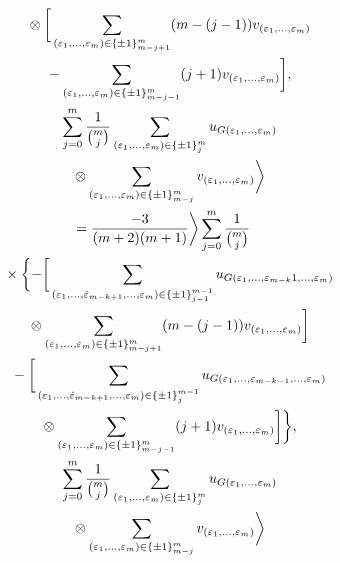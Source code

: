 \documentclass[pdftex]{sigma}
\numberwithin{equation}{section}
\begin{document}
\begin{enumerate}
\begin{itemize}
\begin{gather*}
\hphantom{\eta_{13}^\phi(e_{4k-j_1},e_{4k-j_2}) =}{}
 \otimes\bigg[ \sum_{(\varepsilon_{1},\dots, \varepsilon_{m})\in\{\pm
1\}_{m-j+1}^{m}}(m-(j-1))v_{(\varepsilon_{1},\dots,\varepsilon_m)}\\
\hphantom{\eta_{13}^\phi(e_{4k-j_1},e_{4k-j_2}) =}{}
-\sum_{(\varepsilon_{1},\dots, \varepsilon_{m})\in\{\pm
1\}_{m-j-1}^{m}}(j+1)v_{(\varepsilon_{1},\dots,\varepsilon_m)}\bigg] ,\\
\hphantom{\eta_{13}^\phi(e_{4k-j_1},e_{4k-j_2}) =}{}
\sum_{j=0}^{m}\frac{1}{{m\choose j}}\sum_{(\varepsilon_{1},\dots, \varepsilon_{m})\in\{\pm
1\}_{j}^{m}}u_{G(\varepsilon_1,\dots,\varepsilon_m)}\\
\hphantom{\eta_{13}^\phi(e_{4k-j_1},e_{4k-j_2}) =}{}
\otimes
\sum_{(\varepsilon_{1},\dots, \varepsilon_{m})\in\{\pm 1\}_{m-j}^{m}}v_{(\varepsilon_1,\dots,\varepsilon_m)}\bigg\rangle\\
\hphantom{\eta_{13}^\phi(e_{4k-j_1},e_{4k-j_2})}{}
 = \frac{-3}{(m+2)(m+1)}\bigg\rangle \sum_{j=0}^{m}\frac{1}{{m\choose j}}\\
\hphantom{\eta_{13}^\phi(e_{4k-j_1},e_{4k-j_2})=}{} \times
 \bigg\{ {-}\bigg[ \sum_{(\varepsilon_{1},\dots,\hat{\varepsilon}_{m-k+1},\dots, \varepsilon_{m})\in\{\pm
1\}_{j-1}^{m-1}}u_{G(\varepsilon_{1},\dots, \varepsilon_{m-k} 1,\dots,\varepsilon_{m})}\\
\hphantom{\eta_{13}^\phi(e_{4k-j_1},e_{4k-j_2})=}{}
\otimes \sum_{(\varepsilon_{1},\dots,
\varepsilon_{m})\in\{\pm 1\}_{m-j+1}^{m}}(m-(j-1))v_{(\varepsilon_{1},\dots,\varepsilon_m)}\bigg]\\
\hphantom{\eta_{13}^\phi(e_{4k-j_1},e_{4k-j_2})=}{}
 - \bigg[ \sum_{(\varepsilon_{1},\dots,\hat{\varepsilon}_{m-k+1},\dots, \varepsilon_{m})\in\{\pm
1\}_{j}^{m-1}}u_{G(\varepsilon_{1},\dots, \varepsilon_{m-k -1} ,\dots,\varepsilon_{m})}\\
\hphantom{\eta_{13}^\phi(e_{4k-j_1},e_{4k-j_2})=}{}
\otimes \sum_{(\varepsilon_{1},\dots, \varepsilon_{m})\in\{\pm
1\}_{m-j-1}^{m}}(j+1)v_{(\varepsilon_{1},\dots,\varepsilon_m)}\bigg] \bigg\},\\
\hphantom{\eta_{13}^\phi(e_{4k-j_1},e_{4k-j_2})=}{}
 \sum_{j=0}^{m}\frac{1}{{m\choose j}}\sum_{(\varepsilon_{1},\dots, \varepsilon_{m})\in\{\pm
1\}_{j}^{m}}u_{G(\varepsilon_1,\dots,\varepsilon_m)}\\
\hphantom{\eta_{13}^\phi(e_{4k-j_1},e_{4k-j_2})=}{}
\otimes \sum_{(\varepsilon_{1},\dots, \varepsilon_{m})\in\{\pm 1\}_{m-j}^{m}}v_{(\varepsilon_1,\dots,\varepsilon_m)}\bigg\rangle \\
\hphantom{\eta_{13}^\phi(e_{4k-j_1},e_{4k-j_2})}{}

\end{gather*}
\end{itemize}
\end{enumerate}
\end{document}

